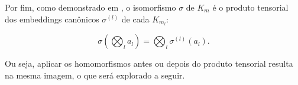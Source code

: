 Por fim, como demonstrado em \cite{lyubashevsky2013}, o isomorfismo $\sigma$ de $K_m$ é o produto tensorial dos embeddings canônicos $\sigma^{(l)}$ de cada $K_{m_l}$:

\begin{equation}
    \label{eq:ring_embeddings}
    \sigma\left(\bigotimes_l a_l\right) = \bigotimes_l \sigma^{(l)}(a_l).
\end{equation}

Ou seja, aplicar os homomorfismos antes ou depois do produto tensorial resulta na mesma imagem, o que será explorado a seguir.